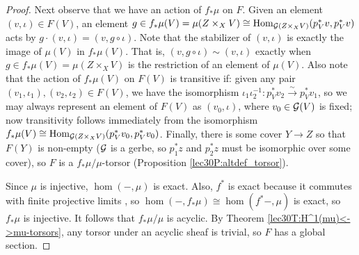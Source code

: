 \begin{proof}
 Next observe that we have an action of $f_*\mu$ on $F$. Given an element $(v,\iota)\in F(V)$, an element $g\in f_*\mu(V)=\mu(Z\times_X V)\cong \operatorname{Hom}_{\mathcal{G}(Z\times_X V)}(p_V^*v,p_V^*v)$ acts by $g\cdot (v,\iota) = (v,g\circ\iota)$. Note that the stabilizer of $(v,\iota)$ is exactly the image of $\mu(V)$ in $f_*\mu(V)$. That is, $(v,g\circ \iota)\sim (v,\iota)$ exactly when $g\in f_*\mu(V)=\mu(Z\times_X V)$ is the restriction of an element of $\mu(V)$. Also note that the action of $f_*\mu(V)$ on $F(V)$ is transitive if: given any pair $(v_1,\iota_1),(v_2,\iota_2)\in F(V)$, we have the isomorphism $\iota_1\iota_2^{-1}:p_V^*v_2\xrightarrow\sim p_V^*v_1$, so we may always represent an element of $F(V)$ as $(v_0,\iota)$, where $v_0\in \mathcal{G}(V)$ is fixed; now transitivity follows immediately from the isomorphism $f_*\mu(V)\cong \operatorname{Hom}_{\mathcal{G}(Z\times_X V)}(p_V^*v_0,p_V^*v_0)$. Finally, there is some cover $Y\to Z$ so that $F(Y)$ is non-empty ($\mathcal{G}$ is a gerbe, so $p_1^*z$ and $p_2^*z$ must be isomorphic over some cover), so $F$ is a $f_*\mu/\mu$-torsor (Proposition \ref{lec30P:altdef_torsor}).

 Since $\mu$ is injective, $\hom(-,\mu)$ is exact. Also, $f^*$ is exact because it commutes with finite projective limits , so $\hom(-,f_*\mu)\cong\hom(f^*-,\mu)$ is exact, so $f_*\mu$ is injective. It follows that $f_*\mu/\mu$ is acyclic. By Theorem \ref{lec30T:H^1(mu)<->mu-torsors}, any torsor under an acyclic sheaf is trivial, so $F$ has a global section.
\end{proof}


